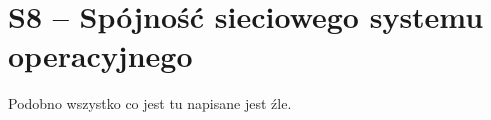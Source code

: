 \section{S8 -- Spójność sieciowego systemu operacyjnego}


Podobno wszystko co jest tu napisane jest źle.
